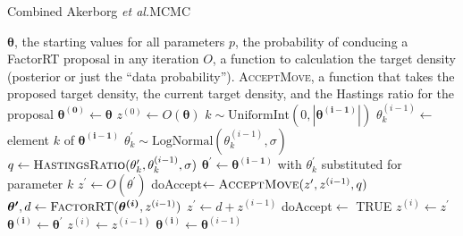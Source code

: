 \documentclass{llncs}
\newcommand{\etal}[0]{{\em et al.}\xspace}
\begin{document}
\begin{algorithm} \caption{Combined Akerborg \etal \textsc{MCMC}}\label{AMCMC}
\begin{algorithmic}
    \REQUIRE $\boldsymbol{\theta}$, the starting values for all parameters
    \REQUIRE $p$, the probability of conducing a FactorRT proposal in any iteration
    \REQUIRE $O$, a function to calculation the target density (posterior or just the ``data probability'').
    \REQUIRE \textsc{AcceptMove}, a function that takes the proposed target density, the current target density, and the Hastings ratio for the proposal
\STATE  $\boldsymbol{\theta^{(0)}} \leftarrow \boldsymbol{\theta}$
\STATE  $z^{(0)} \leftarrow O(\boldsymbol{\theta})$
\FOR{$i \in \left[1, 2,\ldots \infty \right) $}
        \STATE $k \sim \mbox{UniformInt}(0, \left|\boldsymbol{\theta^{(i-1)}}\right|)$
        \STATE $\theta_k^{(i-1)}\leftarrow$ element $k$ of $\boldsymbol{\theta^{(i-1)}}$
        \STATE $\theta_k^{\prime} \sim \mbox{LogNormal}(\theta_k^{(i-1)}, \sigma)$
        \STATE $q \leftarrow  \mbox{\textsc{HastingsRatio}}(\theta_k^{\prime}, \theta_k^{(i-1)}, \sigma)$
        \STATE $\boldsymbol{\theta^{\prime}}\leftarrow \boldsymbol{\theta^{(i-1)}}$ with $\theta_k^{\prime}$ substituted for parameter $k$
        \STATE $z^{\prime} \leftarrow  O(\theta^{\prime})$
        \STATE doAccept$ \leftarrow \mbox{\textsc{AcceptMove}}(z^{\prime}, z^{(i-1)}, q)$
    \ELSE
        \STATE $\boldsymbol{\theta^{\prime}}, d \leftarrow \mbox{\textsc{FactorRT}}(\boldsymbol{\theta^{(i)}}, z^{(i-1)})$
        \STATE $z^{\prime} \leftarrow  d + z^{(i-1)}$
        \STATE doAccept$ \leftarrow$ TRUE
    \ENDIF
        \STATE $z^{(i)} \leftarrow  z^{\prime}$
        \STATE $\boldsymbol{\theta^{(i)}} \leftarrow \boldsymbol{\theta}^{\prime}$
    \ELSE
    \STATE $z^{(i)} \leftarrow  z^{(i-1)}$
    \STATE $\boldsymbol{\theta^{(i)}} \leftarrow \boldsymbol{\theta}^{(i-1)}$
    \ENDIF
\ENDFOR
\end{algorithmic}
\end{algorithm}
\end{document}
